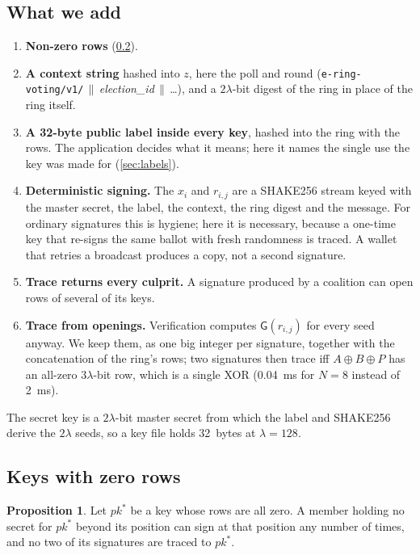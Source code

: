 \documentclass[11pt,a4paper]{article}
\newcommand{\pk}{\mathit{pk}}
\newcommand{\Gf}{\mathsf{G}}
\theoremstyle{definition}
\newtheorem{proposition}{Proposition}
\begin{document}
\subsection{What we add}
\label{sec:ours}

\begin{enumerate}[leftmargin=*]
\item \textbf{Non-zero rows} (\cref{sec:zerorow}).
\item \textbf{A context string} hashed into $z$, here the poll and round
      (\texttt{e-ring-voting/v1/}$\,\|\,$\textit{election\_id}$\,\|\,$\ldots),
      and a $2\lambda$-bit digest of the ring in place of the ring itself.
\item \textbf{A 32-byte public label inside every key}, hashed into the
      ring with the rows. The application decides what it means; here it
      names the single use the key was made for (\cref{sec:labels}).
\item \textbf{Deterministic signing.} The $x_i$ and $r_{i,j}$ are a
      SHAKE256 stream keyed with the master secret, the label, the
      context, the ring digest and the message. For ordinary signatures
      this is hygiene; here it is necessary, because a one-time key that
      re-signs the same ballot with fresh randomness is traced. A wallet
      that retries a broadcast produces a copy, not a second signature.
\item \textbf{Trace returns every culprit.} A signature produced by a
      coalition can open rows of several of its keys.
\item \textbf{Trace from openings.} Verification computes $\Gf(r_{i,j})$
      for every seed anyway. We keep them, as one big integer per
      signature, together with the concatenation of the ring's rows; two
      signatures then trace iff $A \oplus B \oplus P$ has an all-zero
      $3\lambda$-bit row, which is a single XOR (0.04~ms for $N = 8$
      instead of 2~ms).
\end{enumerate}
The secret key is a $2\lambda$-bit master secret from which the label and
SHAKE256 derive the $2\lambda$ seeds, so a key file holds 32~bytes at
$\lambda = 128$.

\subsection{Keys with zero rows}
\label{sec:zerorow}

\begin{proposition}
Let $\pk^\ast$ be a key whose rows are all zero. A member holding no
secret for $\pk^\ast$ beyond its position can sign at that position any
number of times, and no two of its signatures are traced to $\pk^\ast$.
\end{proposition}
\end{document}
